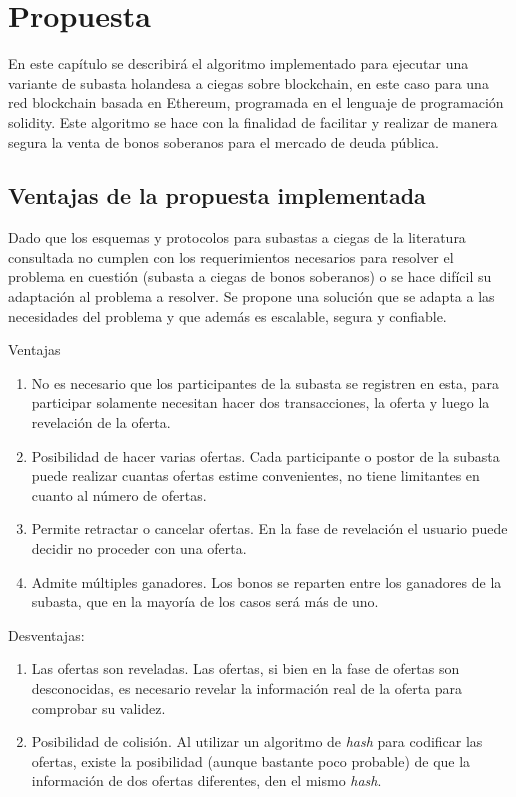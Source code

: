 \chapter{Propuesta}\label{chapter:proposal}

  En este capítulo se describirá el algoritmo implementado para ejecutar una variante de subasta holandesa
a ciegas sobre blockchain, en este caso para una red blockchain basada en Ethereum, programada en el 
lenguaje de programación solidity. Este algoritmo se hace con la finalidad de facilitar y realizar de manera
segura la venta de bonos soberanos para el mercado de deuda pública. 

  \section{Ventajas de la propuesta implementada}
    Dado que los esquemas y protocolos para subastas a ciegas de la literatura consultada no cumplen con los requerimientos necesarios
    para resolver el problema en cuestión (subasta a ciegas de bonos soberanos) o se hace difícil su adaptación al problema a resolver.
    Se propone una solución que se adapta a las necesidades del problema y que además es escalable, segura y confiable.

    Ventajas

    \begin{enumerate}
      \item No es necesario que los participantes de la subasta se registren en esta, para participar solamente necesitan hacer dos 
      transacciones, la oferta y luego la revelación de la oferta.
      \item Posibilidad de hacer varias ofertas. Cada participante o postor de la subasta puede realizar cuantas ofertas estime convenientes,
      no tiene limitantes en cuanto al número de ofertas.
      \item Permite retractar o cancelar ofertas. En la fase de revelación el usuario puede decidir no proceder con una oferta.
      \item Admite múltiples ganadores. Los bonos se reparten entre los ganadores de la subasta, que en la mayoría de los casos será más 
      de uno. 
    \end{enumerate}

    Desventajas:
  
    \begin{enumerate}
      \item Las ofertas son reveladas. Las ofertas, si bien en la fase de ofertas son desconocidas, es necesario revelar la información
      real de la oferta para comprobar su validez.
      \item Posibilidad de colisión. Al utilizar un algoritmo de \textit{hash} para codificar las ofertas, existe la posibilidad (aunque bastante
      poco probable) de que la información de dos ofertas diferentes, den el mismo \textit{hash}. 
    \end{enumerate}

